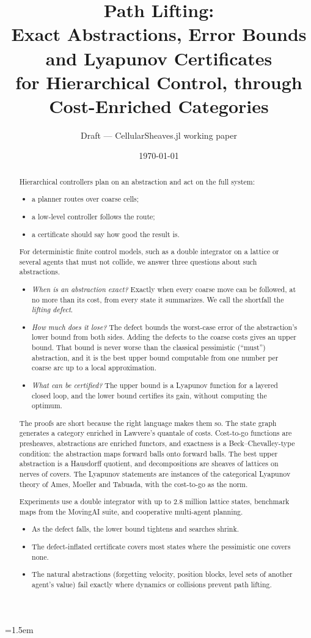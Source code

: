 \documentclass[11pt]{article}
\title{Path Lifting:\\ Exact Abstractions, Error Bounds and Lyapunov Certificates\\
for Hierarchical Control, through Cost-Enriched Categories}
\author{Draft --- CellularSheaves.jl working paper}
\date{\today}
\theoremstyle{definition}
\theoremstyle{remark}
\begin{document}
\emergencystretch=1.5em
\maketitle

\begin{abstract}
Hierarchical controllers plan on an abstraction and act on the full system:
\begin{itemize}[nosep]
\item a planner routes over coarse cells;
\item a low-level controller follows the route;
\item a certificate should say how good the result is.
\end{itemize}
For deterministic finite control models, such as a double integrator on a lattice
or several agents that must not collide, we answer three questions about such
abstractions.
\begin{itemize}[nosep]
\item \emph{When is an abstraction exact?} Exactly when every coarse move can be
  followed, at no more than its cost, from every state it summarizes. We call the
  shortfall the \emph{lifting defect}.
\item \emph{How much does it lose?} The defect bounds the worst-case error of the
  abstraction's lower bound from both sides. Adding the defects to the coarse costs
  gives an upper bound. That bound is never worse than the classical pessimistic
  (``must'') abstraction, and it is the best upper bound computable from one
  number per coarse arc up to a local approximation.
\item \emph{What can be certified?} The upper bound is a Lyapunov function for a
  layered closed loop, and the lower bound certifies its gain, without computing
  the optimum.
\end{itemize}
The proofs are short because the right language makes them so. The state graph
generates a category enriched in Lawvere's quantale of costs. Cost-to-go
functions are presheaves, abstractions are enriched functors, and exactness is a
Beck--Chevalley-type condition: the abstraction maps forward balls onto forward
balls. The best upper abstraction is a Hausdorff quotient, and decompositions are
sheaves of lattices on nerves of covers. The Lyapunov statements are instances of
the categorical Lyapunov theory of Ames, Moeller and Tabuada, with the cost-to-go
as the norm.

Experiments use a double integrator with up to $2.8$ million lattice states,
benchmark maps from the MovingAI suite, and cooperative multi-agent planning.
\begin{itemize}[nosep]
\item As the defect falls, the lower bound tightens and searches shrink.
\item The defect-inflated certificate covers most states where the pessimistic one
  covers none.
\item The natural abstractions (forgetting velocity, position blocks, level sets
  of another agent's value) fail exactly where dynamics or collisions prevent path
  lifting.
\end{itemize}
\end{abstract}
\end{document}
